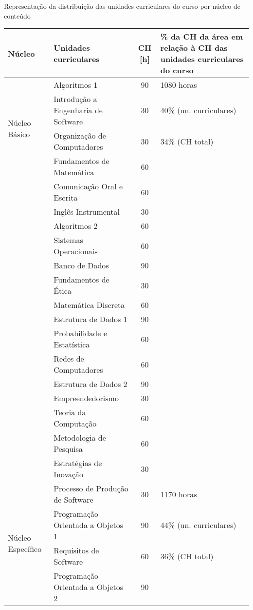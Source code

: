 
\begin{quadro}[ht!]
\caption{Representação da distribuição das unidades curriculares do curso por núcleo de conteúdo}
\label{tab:discarea}
\centering
\scriptsize
\begin{tabular}{|l|l|c|p{3.2cm}|}
\hline
\rowcolor{blue1}
Núcleo  & Unidades curriculares & CH [h]  & \% da CH da área em relação à CH das unidades curriculares do curso\\\hline
\multirow{4}{*}{Núcleo Básico} & Algoritmos 1 & 90 & 1080 horas  \\
\cline{2-3} & Introdução a Engenharia de Software & 30 & 40\% (un. curriculares)\\
\cline{2-3} & Organização de Computadores & 30 & 34\% (CH total)\\
\cline{2-3} & Fundamentos de Matemática & 60 & \\
\cline{2-3} & Comunicação Oral e Escrita & 60 & \\
\cline{2-3} & Inglês Instrumental & 30 & \\
\cline{2-3} & Algoritmos 2 & 60 & \\
\cline{2-3} & Sistemas Operacionais & 60 & \\
\cline{2-3} & Banco de Dados & 90 & \\
\cline{2-3} & Fundamentos de Ética & 30 & \\
\cline{2-3} & Matemática Discreta & 60 & \\
\cline{2-3} & Estrutura de Dados 1 & 90 & \\
\cline{2-3} & Probabilidade e Estatística & 60 & \\
\cline{2-3} & Redes de Computadores & 60 & \\
\cline{2-3} & Estrutura de Dados 2 & 90 & \\
\cline{2-3} & Empreendedorismo & 30 & \\
\cline{2-3} & Teoria da Computação & 60 & \\
\cline{2-3} & Metodologia de Pesquisa & 60 & \\
\cline{2-3} & Estratégias de Inovação & 30 & \\
\hline
\multirow{4}{*}{Núcleo Específico} & Processo de Produção de Software & 30 & 1170 horas  \\
\cline{2-3} & Programação Orientada a Objetos 1  & 90 & 44\% (un. curriculares)\\
\cline{2-3} & Requisitos de Software & 60 & 36\% (CH total)\\
\cline{2-3} & Programação Orientada a Objetos 2 & 90 & \\

\end{tabular}
\end{quadro}
